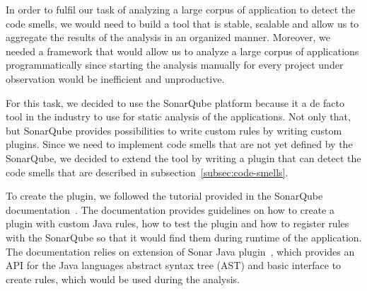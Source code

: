 

In order to fulfil our task of analyzing a large corpus of application to detect the code smells,
we would need to build a tool that is stable, scalable and allow us to aggregate the results of the
analysis in an organized manner.
Moreover, we needed a framework that would allow us to analyze a large corpus of applications programmatically since starting
the analysis manually for every project under observation would be inefficient and unproductive.

For this task, we decided to use the SonarQube platform because it a de facto tool in the industry to use
for static analysis of the applications.
Not only that, but SonarQube provides possibilities to write custom rules by writing custom plugins.
Since we need to implement code smells that are not yet defined by the SonarQube, we decided to extend
the tool by writing a plugin that can detect the code smells that are described in subsection~\ref{subsec:code-smells}.


To create the plugin, we followed the tutorial provided in the SonarQube documentation~\cite{sonar_plugin_tutorial}.
The documentation provides guidelines on how to create a plugin with custom Java rules, how to test the plugin and
how to register rules with the SonarQube so that it would find them during runtime of the application.
The documentation relies on extension of Sonar Java plugin~\cite{sonar_java_plugin}, which provides an API
for the Java languages abstract syntax tree (AST) and basic interface to create rules, which would be used
during the analysis.

